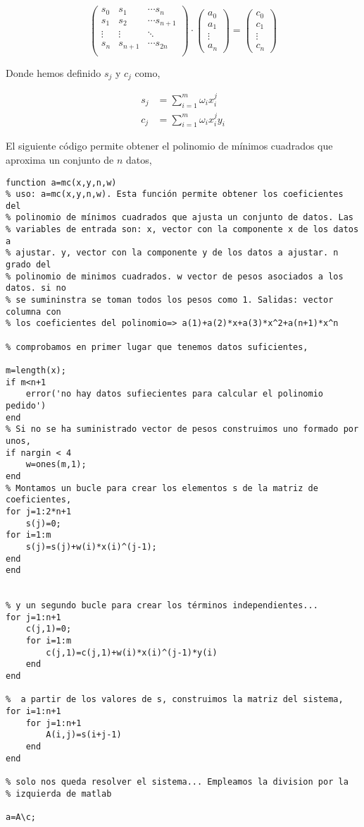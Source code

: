 \begin{equation*}
\begin{pmatrix}
s_0& s_1& \cdots s_n\\
s_1& s_2& \cdots s_{n+1}\\
\vdots & \vdots & \ddots \\
s_n& s_{n+1}& \cdots s_{2n}\\
\end{pmatrix}\cdot \begin{pmatrix}
a_0\\
a_1\\
\vdots \\
a_n
\end{pmatrix}=\begin{pmatrix}
c_0\\
c_1\\
\vdots \\
c_n
\end{pmatrix}
\end{equation*} 

Donde hemos definido $s_j$ y $c_j$ como,

\begin{align*}
s_j&=\sum_{i=1}^m \omega_ix_i^j\\
c_j&=\sum_{i=1}^m \omega_ix_i^jy_i
\end{align*}
 
El siguiente código permite obtener el polinomio de mínimos cuadrados que aproxima un conjunto de $n$ datos,

\begin{lstlisting}
function a=mc(x,y,n,w)
% uso: a=mc(x,y,n,w). Esta función permite obtener los coeficientes del
% polinomio de mínimos cuadrados que ajusta un conjunto de datos. Las
% variables de entrada son: x, vector con la componente x de los datos a
% ajustar. y, vector con la componente y de los datos a ajustar. n grado del
% polinomio de minimos cuadrados. w vector de pesos asociados a los datos. si no
% se sumininstra se toman todos los pesos como 1. Salidas: vector columna con
% los coeficientes del polinomio=> a(1)+a(2)*x+a(3)*x^2+a(n+1)*x^n

% comprobamos en primer lugar que tenemos datos suficientes,

m=length(x);
if m<n+1
    error('no hay datos sufiecientes para calcular el polinomio pedido')
end
% Si no se ha suministrado vector de pesos construimos uno formado por unos,
if nargin < 4
	w=ones(m,1);
end
% Montamos un bucle para crear los elementos s de la matriz de coeficientes,
for j=1:2*n+1
    s(j)=0;    
for i=1:m
    s(j)=s(j)+w(i)*x(i)^(j-1);
end
end


% y un segundo bucle para crear los términos independientes...
for j=1:n+1
    c(j,1)=0;
    for i=1:m
        c(j,1)=c(j,1)+w(i)*x(i)^(j-1)*y(i)
    end
end

%  a partir de los valores de s, construimos la matriz del sistema,
for i=1:n+1
    for j=1:n+1
        A(i,j)=s(i+j-1)
    end
end

% solo nos queda resolver el sistema... Empleamos la division por la
% izquierda de matlab

a=A\c;
\end{lstlisting}

